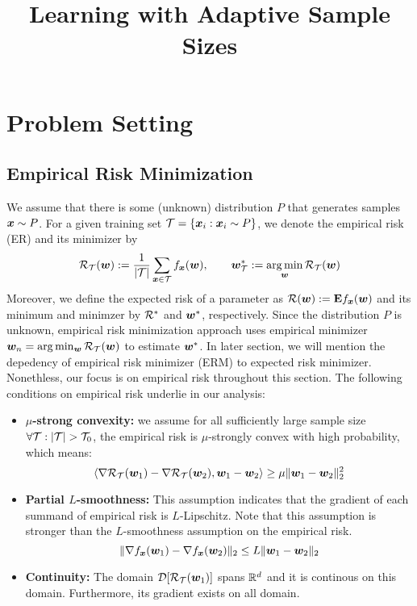 \documentclass{article}
\author{}
\begin{document}
\title{Learning with Adaptive Sample Sizes}

\date{} 

\maketitle

\section{Problem Setting}
\subsection{Empirical Risk Minimization}
We assume that there is some (unknown) distribution $P$ that generates samples
$\bm{x} \sim P$. For a given training set ${\cal T} = \{\bm{x}_i: \bm{x}_i \sim P \}$, we denote
the empirical risk (ER) and its minimizer by
\begin{align}
{\cal R}_{\cal T}(\bm{w}) := \frac {1}{|{\cal T}|} \sum_{\bm{x} \in {\cal T}} f_{\bm{x}}(\bm{w}),
\qquad \bm{w}^*_{\cal T} := \operatorname*{\arg\min}_{\bm{w}} {\cal R}_{{\cal T}}(\bm{w}) 
\end{align}
Moreover, we define the expected risk of a parameter as ${\cal R}(\bm{w}) := \mathbf{E}
f_{\bm{x}}(\bm{w})$ and its minimum and minimzer by ${\cal R}^*$ and $\bm{w}^*$, respectively.
Since the distribution $P$ is unknown, empirical risk minimization approach
uses empirical minimizer $\bm{w}_n = \arg\min_{\bm{w}} {\cal R}_{{\cal T}}(\bm{w})$ to estimate
$\bm{w}^*$. In later section, we will mention the depedency of empirical risk
minimizer (ERM) to expected risk minimizer. Nonethless, our focus is on
empirical risk throughout this section. The following conditions
on empirical risk underlie in our analysis:
\begin{itemize}
  \item \textbf{$\mu$-strong convexity:} we assume for all sufficiently large
  sample size $\forall \T:|\T|> \T_0$, the empirical risk is $\mu$-strongly
  convex with high probability, which means: 
  \begin{equation*}
  	\langle \nabla {\cal R}_{\cal T}(\bm{w}_1) - \nabla {\cal R}_{\cal T}(\bm{w}_2), \bm{w}_1 - \bm{w}_2 \rangle
  	\geq  \mu \| \bm{w}_1 - \bm{w}_2 \|_2^2
  \end{equation*}
  \item \textbf{Partial $L$-smoothness:} This assumption indicates that the
  gradient of each summand of empirical risk is $L$-Lipschitz. Note that this
  assumption is stronger than the $L$-smoothness assumption on the empirical
  risk.
  \begin{equation*}
  	\| \nabla f_{\bm{x}}(\bm{w}_1) - \nabla f_{\bm{x}}(\bm{w}_2) \|_2
  	\leq  L \| \bm{w}_1 - \bm{w}_2 \|_2
  \end{equation*}
  \item \textbf{Continuity:} The domain $\mathcal{D}[{\cal R}_{\cal T}(\bm{w}_1)]$ spans
  $\mathbb{R}^d$ and it is continous on this domain. Furthermore, its gradient exists on
  all domain. 
\end{itemize}
\end{document}
